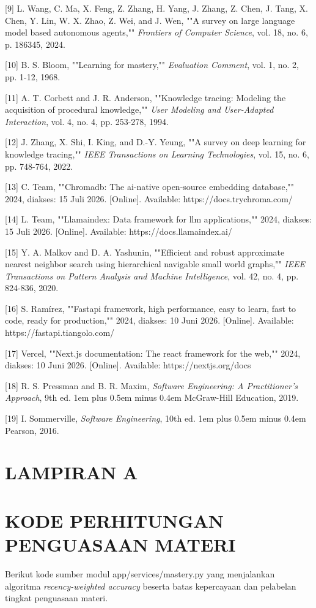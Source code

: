 \documentclass[12pt,a4paper]{article}
\begin{document}
{[}9{]}	L. Wang, C. Ma, X. Feng, Z. Zhang, H. Yang, J. Zhang, Z. Chen, J. Tang, X. Chen, Y. Lin, W. X. Zhao, Z. Wei, and J. Wen, ""A survey on large language model based autonomous agents,"" \textit{Frontiers of Computer Science}, vol. 18, no. 6, p. 186345, 2024.

{[}10{]}	B. S. Bloom, ""Learning for mastery,"" \textit{Evaluation Comment}, vol. 1, no. 2, pp. 1-12, 1968.

{[}11{]}	A. T. Corbett and J. R. Anderson, ""Knowledge tracing: Modeling the acquisition of procedural knowledge,"" \textit{User Modeling and User-Adapted Interaction}, vol. 4, no. 4, pp. 253-278, 1994.

{[}12{]}	J. Zhang, X. Shi, I. King, and D.-Y. Yeung, ""A survey on deep learning for knowledge tracing,"" \textit{IEEE Transactions on Learning Technologies}, vol. 15, no. 6, pp. 748-764, 2022.

{[}13{]}	C. Team, ""Chromadb: The ai-native open-source embedding database,"" 2024, diakses: 15 Juli 2026. {[}Online{]}. Available: https://docs.trychroma.com/

{[}14{]}	L. Team, ""Llamaindex: Data framework for llm applications,"" 2024, diakses: 15 Juli 2026. {[}Online{]}. Available: https://docs.llamaindex.ai/

{[}15{]}	Y. A. Malkov and D. A. Yashunin, ""Efficient and robust approximate nearest neighbor search using hierarchical navigable small world graphs,"" \textit{IEEE Transactions on Pattern Analysis and Machine Intelligence}, vol. 42, no. 4, pp. 824-836, 2020.

{[}16{]}	S. Ramírez, ""Fastapi framework, high performance, easy to learn, fast to code, ready for production,"" 2024, diakses: 10 Juni 2026. {[}Online{]}. Available: https://fastapi.tiangolo.com/

{[}17{]}	Vercel, ""Next.js documentation: The react framework for the web,"" 2024, diakses: 10 Juni 2026. {[}Online{]}. Available: https://nextjs.org/docs

{[}18{]}	R. S. Pressman and B. R. Maxim, \textit{Software Engineering: A Practitioner's Approach}, 9th ed. 1em plus 0.5em minus 0.4em McGraw-Hill Education, 2019.

{[}19{]}	I. Sommerville, \textit{Software Engineering}, 10th ed. 1em plus 0.5em minus 0.4em Pearson, 2016.

\section*{LAMPIRAN A}
\section*{KODE PERHITUNGAN PENGUASAAN MATERI}
Berikut kode sumber modul app/services/mastery.py yang menjalankan algoritma \textit{recency-weighted accuracy} beserta batas kepercayaan dan pelabelan tingkat penguasaan materi.
\end{document}
